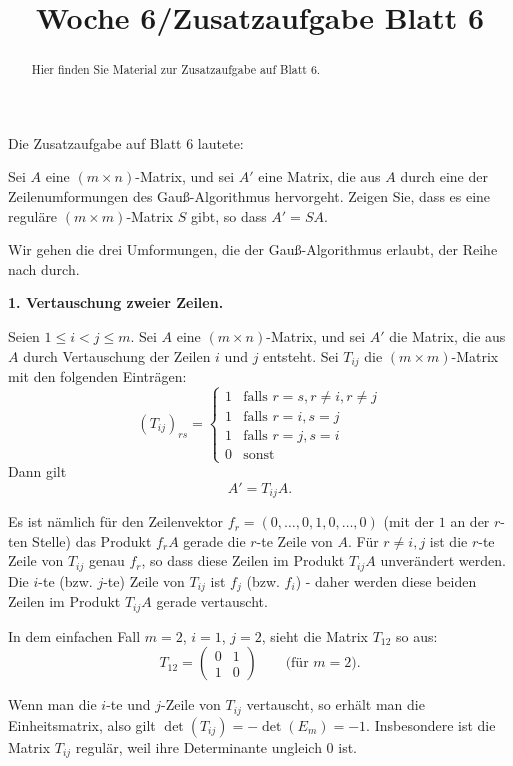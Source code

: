 \documentclass{ximera}
\title{Woche 6/Zusatzaufgabe Blatt 6}
\begin{document}
\begin{abstract}
Hier finden Sie Material zur Zusatzaufgabe auf Blatt 6.
\end{abstract}
\maketitle

Die Zusatzaufgabe auf Blatt 6 lautete:

Sei $A$ eine $(m\times n)$-Matrix, und sei $A'$ eine Matrix, die aus $A$ durch eine der Zeilenumformungen des Gauß-Algorithmus hervorgeht. Zeigen Sie, dass es eine reguläre $(m\times m)$-Matrix $S$ gibt, so dass $A'=SA$.


Wir gehen die drei Umformungen, die der Gauß-Algorithmus erlaubt, der Reihe nach durch.

\textbf{1. Vertauschung zweier Zeilen.}

Seien $1\le i < j \le m$. Sei $A$ eine $(m\times n)$-Matrix, und sei $A'$ die Matrix, die aus $A$ durch Vertauschung der Zeilen $i$ und $j$ entsteht. Sei $T_{ij}$ die $(m\times m)$-Matrix mit den folgenden Einträgen:
\[
(T_{ij})_{rs} = \left\{
\begin{array}{ll}
1 & \text{falls } r=s, r\ne i, r\ne j\\
1 & \text{falls } r = i, s = j \\
1 & \text{falls } r = j, s = i \\
0 & \text{sonst}
\end{array}
\right.
\]
Dann gilt
\[
A' = T_{ij} A.
\]

Es ist nämlich für den Zeilenvektor $f_r = (0,\dots, 0,1,0,\dots, 0)$ (mit der $1$ an der $r$-ten Stelle) das Produkt $f_r A$ gerade die $r$-te Zeile von $A$. Für $r\ne i,j$ ist die $r$-te Zeile von $T_{ij}$ genau $f_r$, so dass diese Zeilen im Produkt $T_{ij}A$ unverändert werden. Die $i$-te (bzw. $j$-te) Zeile von $T_{ij}$ ist $f_j$ (bzw. $f_i$) - daher werden diese beiden Zeilen im Produkt $T_{ij}A$ gerade vertauscht.

In dem einfachen Fall $m=2$, $i=1$, $j=2$, sieht die Matrix $T_{12}$ so aus:
\[
T_{12} = \left(
\begin{array}{cc}
0 & 1 \\ 1 & 0
\end{array}
\right)\qquad\text{(für $m=2$).}
\]

Wenn man die $i$-te und $j$-Zeile von $T_{ij}$ vertauscht, so erhält man die Einheitsmatrix, also gilt $\det(T_{ij}) = -\det(E_m) = -1$. Insbesondere ist die Matrix $T_{ij}$ regulär, weil ihre Determinante ungleich $0$ ist.
\end{document}
